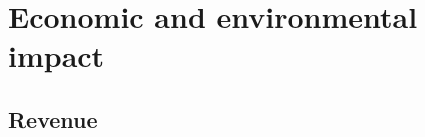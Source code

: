 
\part{Economic and environmental impact}
\newpage
\chapter{Revenue} \label{ch:hendrerit}

%


%
%


